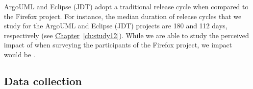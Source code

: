 ArgoUML and Eclipse (JDT) adopt a traditional release cycle when compared to the
Firefox project. For instance, the median duration of release cycles that we
study for the ArgoUML and Eclipse (JDT) projects are 180 and 112 days,
respectively (see \hyperref[ch:study12]{Chapter}~\ref{ch:study12}). While we are
able to study the perceived impact of \DIFdelbegin {}\DIFdelend \DIFaddbegin {}\DIFaddend when surveying the
participants of the Firefox project, we \DIFdelbegin {}\DIFdelend \DIFaddbegin {}\DIFaddend impact would be \DIFdelbegin {}\DIFdelend \DIFaddbegin \DIFadd{(}\ie {}\DIFaddend . 

\subsection{Data collection}\label{ch5:datacollection2}

